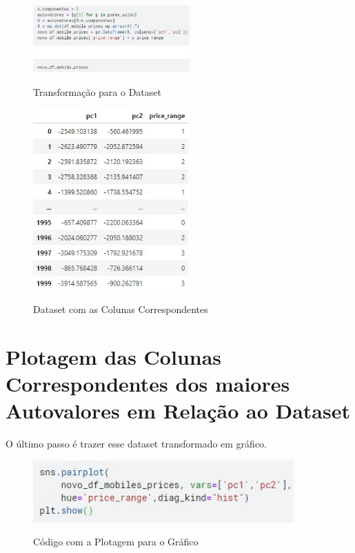 \documentclass{report}
\begin{document}
\begin{figure}[htbp]
\centering
\caption{Transformação para o Dataset}
\includegraphics[width=6cm]{figures/cod_mudanca_p_dataset.jpg}
\label{figura com o código da transformação para o dataset}
\end{figure}

\begin{figure}[htbp]
\centering
\caption{Dataset com as Colunas Correspondentes}
\includegraphics[width=6cm]{figures/dataset_transformado.jpg}
\label{figura com o dataset transformado}
\end{figure}

\section{Plotagem das Colunas Correspondentes dos maiores Autovalores em Relação ao Dataset}
O último passo é trazer esse dataset transformado em gráfico.

\begin{figure}[htbp]
\centering
\caption{Código com a Plotagem para o Gráfico}
\includegraphics[width=10cm]{figures/cod_plot.jpg}
\label{figura com o código da plotagem do gráfico}
\end{figure}
\end{document}
